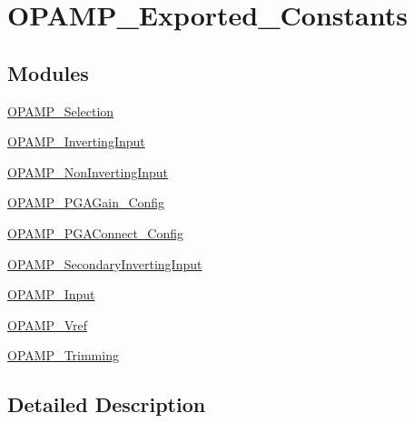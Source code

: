 \hypertarget{group___o_p_a_m_p___exported___constants}{\section{O\-P\-A\-M\-P\-\_\-\-Exported\-\_\-\-Constants}
\label{group___o_p_a_m_p___exported___constants}
}
\subsection*{Modules}
\begin{DoxyCompactItemize}
\item 
\hyperlink{group___o_p_a_m_p___selection}{O\-P\-A\-M\-P\-\_\-\-Selection}
\item 
\hyperlink{group___o_p_a_m_p___inverting_input}{O\-P\-A\-M\-P\-\_\-\-Inverting\-Input}
\item 
\hyperlink{group___o_p_a_m_p___non_inverting_input}{O\-P\-A\-M\-P\-\_\-\-Non\-Inverting\-Input}
\item 
\hyperlink{group___o_p_a_m_p___p_g_a_gain___config}{O\-P\-A\-M\-P\-\_\-\-P\-G\-A\-Gain\-\_\-\-Config}
\item 
\hyperlink{group___o_p_a_m_p___p_g_a_connect___config}{O\-P\-A\-M\-P\-\_\-\-P\-G\-A\-Connect\-\_\-\-Config}
\item 
\hyperlink{group___o_p_a_m_p___secondary_inverting_input}{O\-P\-A\-M\-P\-\_\-\-Secondary\-Inverting\-Input}
\item 
\hyperlink{group___o_p_a_m_p___input}{O\-P\-A\-M\-P\-\_\-\-Input}
\item 
\hyperlink{group___o_p_a_m_p___vref}{O\-P\-A\-M\-P\-\_\-\-Vref}
\item 
\hyperlink{group___o_p_a_m_p___trimming}{O\-P\-A\-M\-P\-\_\-\-Trimming}
\end{DoxyCompactItemize}


\subsection{Detailed Description}
